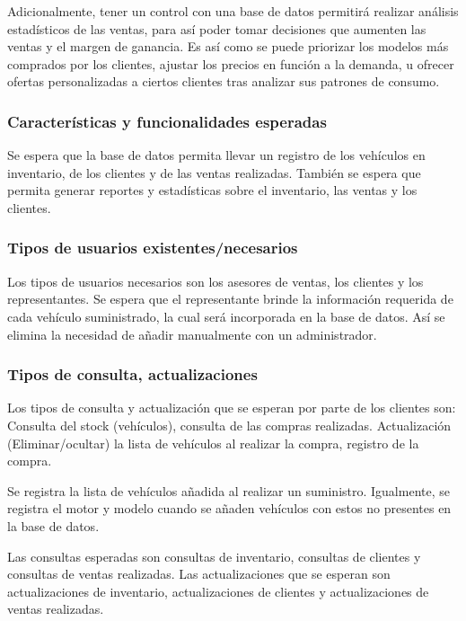 \documentclass[12pt]{article}
\begin{document}
Adicionalmente, tener un control con una base de datos permitirá realizar análisis estadísticos de las ventas, para así poder tomar decisiones que aumenten las ventas y el margen de ganancia. Es así como se puede priorizar los modelos más comprados por los clientes, ajustar los precios en función a la demanda, u ofrecer ofertas personalizadas a ciertos clientes tras analizar sus patrones de consumo.

\subsubsection{Caracter\'isticas y funcionalidades esperadas}

Se espera que la base de datos permita llevar un registro de los vehículos en inventario, de los clientes y de las ventas realizadas. También se espera que permita generar reportes y estadísticas sobre el inventario, las ventas y los clientes.

\subsubsection{Tipos de usuarios existentes/necesarios}

Los tipos de usuarios necesarios son los asesores de ventas, los clientes y los representantes. Se espera que el representante brinde la información requerida de cada vehículo suministrado, la cual será incorporada en la base de datos. Así se elimina la necesidad de añadir manualmente con un administrador.

\subsubsection{Tipos de consulta, actualizaciones}

Los tipos de consulta y actualización que se esperan por parte de los clientes son: Consulta del stock (vehículos),  consulta de las compras realizadas. Actualización (Eliminar/ocultar) la lista de vehículos al realizar la compra, registro de la compra.

Se registra la lista de vehículos añadida al realizar un suministro. Igualmente, se registra el motor y modelo cuando se añaden vehículos con estos no presentes en la base de datos.

Las consultas esperadas son consultas de inventario, consultas de clientes y consultas de ventas realizadas. Las actualizaciones que se esperan son actualizaciones de inventario, actualizaciones de clientes y actualizaciones de ventas realizadas.
\end{document}
